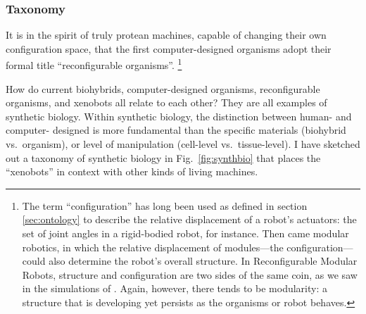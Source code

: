 





\subsubsection*{Taxonomy}




It is in the spirit of truly protean machines, 
capable of changing their own configuration space,
that the first computer-designed organisms
adopt their formal title ``reconfigurable organisms''.%
\footnote{%
The term ``configuration'' has long been used as defined in section \ref{sec:ontology}
to describe the relative displacement of a robot's actuators: 
the set of joint angles in a rigid-bodied robot, for instance.
Then came modular robotics, in which the relative displacement of modules---the configuration---could also determine the robot's overall structure.
In Reconfigurable Modular Robots, structure and configuration are two sides of the same coin, as we saw in the simulations of \citet{pathak2019learning}.
Again, however, there tends to be modularity:
a structure
that is developing yet persists as the organisms or robot behaves.
}



How do current biohybrids,
computer-designed organisms,
reconfigurable organisms,
and xenobots
all relate to each other?
They are all examples of synthetic biology.
Within synthetic biology, the distinction between human- and computer- designed is more fundamental than the specific materials (biohybrid vs.~organism),
or level of manipulation (cell-level vs.~tissue-level).
I have sketched out a taxonomy of synthetic biology in  Fig.~\ref{fig:synthbio} that places the ``xenobots'' in context with other kinds of living machines.

